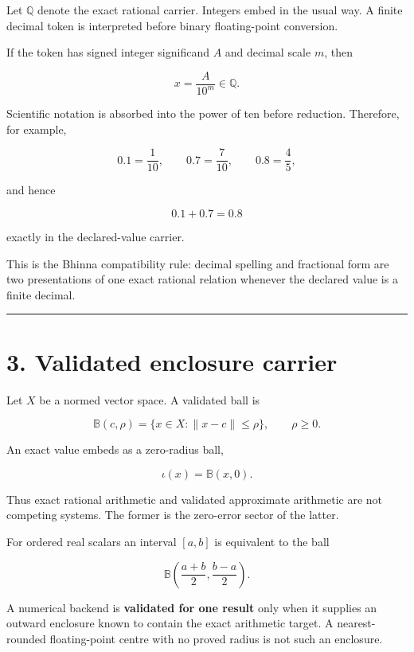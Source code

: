 Let \(\mathbb Q\) denote the exact rational carrier. Integers embed in the
usual way. A finite decimal token is interpreted before binary floating-point
conversion.

If the token has signed integer significand \(A\) and decimal scale \(m\),
then

\[
\boxed{x=\frac{A}{10^m}\in\mathbb Q.}
\tag{2.1}
\]

Scientific notation is absorbed into the power of ten before reduction.
Therefore, for example,

\[
0.1=\frac1{10},\qquad
0.7=\frac7{10},\qquad
0.8=\frac45,
\tag{2.2}
\]

and hence

\[
\boxed{0.1+0.7=0.8}
\tag{2.3}
\]

exactly in the declared-value carrier.

This is the Bhinna compatibility rule: decimal spelling and fractional form are
two presentations of one exact rational relation whenever the declared value is
a finite decimal.

\begin{center}\rule{0.5\linewidth}{0.5pt}\end{center}

\hypertarget{validated-enclosure-carrier}{%
\section{3. Validated enclosure carrier}\label{validated-enclosure-carrier}}

Let \(X\) be a normed vector space. A validated ball is

\[
\boxed{\mathbb B(c,\rho)=\{x\in X:\|x-c\|\le\rho\},\qquad \rho\ge0.}
\tag{3.1}
\]

An exact value embeds as a zero-radius ball,

\[
\boxed{\iota(x)=\mathbb B(x,0).}
\tag{3.2}
\]

Thus exact rational arithmetic and validated approximate arithmetic are not
competing systems. The former is the zero-error sector of the latter.

For ordered real scalars an interval \([a,b]\) is equivalent to the ball

\[
\mathbb B\!\left(\frac{a+b}{2},\frac{b-a}{2}\right).
\tag{3.3}
\]

A numerical backend is \textbf{validated for one result} only when it supplies an
outward enclosure known to contain the exact arithmetic target. A nearest-
rounded floating-point centre with no proved radius is not such an enclosure.

